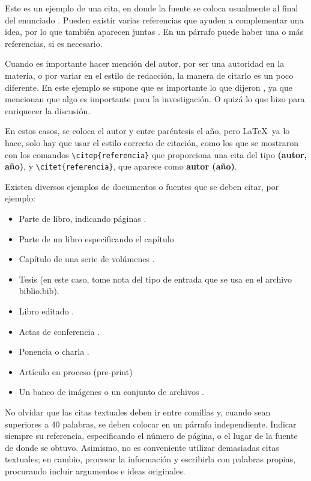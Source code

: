 Este es un ejemplo de una cita, en donde la fuente se coloca usualmente al final del enunciado \citep{bib8}. Pueden existir varias referencias que ayuden a complementar una idea, por lo que también aparecen juntas \citep{bib3,bib11,bib12}. En un párrafo puede haber una o más referencias, si es necesario.  

Cuando es importante hacer mención del autor, por ser una autoridad en la materia, o por variar en el estilo de redacción, la manera de citarlo es un poco diferente. En este ejemplo se supone que es importante lo que dijeron \citet{bib4}, ya que mencionan que algo es importante para la investigación. O quizá lo que hizo \citet{bib12} para enriquecer la discusión.  

En estos casos, se coloca el autor y entre paréntesis el año, pero \LaTeX ~ya lo hace, solo hay que usar el estilo correcto de citación, como los que se mostraron con los comandos \verb|\citep{referencia}| que proporciona una cita del tipo \textbf{(autor, año)}, y \verb|\citet{referencia}|, que aparece como  \textbf{autor (año)}.  

Existen diversos ejemplos de documentos o fuentes que se deben citar, por ejemplo:

\begin{itemize}
\item Parte de libro, indicando páginas \citep[págs. 10--13]{bib5}. 
\item Parte de un libro especificando el capítulo \citep[cap. 4]{bib_chap}
\item Capítulo de una serie de volúmenes \citep{bib7}.
\item Tesis \citep{bib_tesis} (en este caso, tome nota del tipo de entrada que se usa en el archivo biblio.bib).
\item Libro editado \citep{bib6}.
\item Actas de conferencia \citep{bib7}.
\item Ponencia o charla \citep{bib8}.
\item Artículo en proceso (pre-print) \citep{bib10}
\item Un banco de imágenes o un conjunto de archivos \citep{bib9}.
\end{itemize}

No olvidar que las citas textuales deben ir entre comillas y, cuando sean superiores a 40 palabras, se deben colocar en un párrafo independiente. Indicar siempre su referencia, especificando el número de página, o el lugar de la fuente de donde se obtuvo. Asimismo, no es conveniente utilizar demasiadas citas textuales; en cambio, procesar la información y escribirla con palabras propias, procurando incluir argumentos e ideas originales. 

